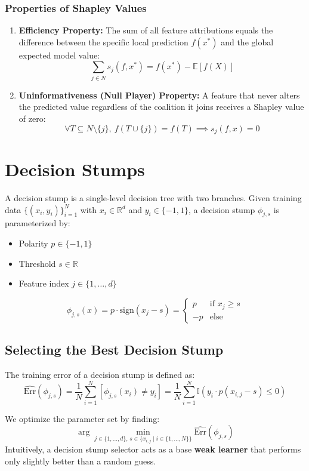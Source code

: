 \documentclass{article}
\begin{document}
\subsubsection{Properties of Shapley Values}
\begin{enumerate}
  \item \textbf{Efficiency Property:} The sum of all feature attributions equals the difference between the specific local prediction $f(x^*)$ and the global expected model value:
  \[ \sum_{j\in N}s_j(f,x^*) = f(x^*) - \mathbb{E}[f(X)] \]
  \item \textbf{Uninformativeness (Null Player) Property:} A feature that never alters the predicted value regardless of the coalition it joins receives a Shapley value of zero:
  \[ \forall T \subseteq N \setminus \{j\}, \ f(T \cup \{j\}) = f(T) \implies s_j(f,x) = 0 \]
\end{enumerate}


\section{Decision Stumps}
A decision stump is a single-level decision tree with two branches. Given training data $\{(x_i,y_i)\}_{i=1}^N$ with $x_i \in \mathbb{R}^d$ and $y_i \in \{-1,1\}$, a decision stump $\phi_{j,s}$ is parameterized by:
\begin{itemize}
  \item Polarity $p \in \{-1,1\}$
  \item Threshold $s \in \mathbb{R}$
  \item Feature index $j \in \{1,\dots,d\}$
\end{itemize}
\[ \phi_{j,s}(x) = p \cdot \text{sign}(x_j - s) = \begin{cases}
  p & \text{if } x_j \geq s \\
  -p & \text{else}
\end{cases} \]

\subsection{Selecting the Best Decision Stump}
The training error of a decision stump is defined as:
\[ \hat{\text{Err}}(\phi_{j,s}) = \frac{1}{N}\sum_{i=1}^N \left[\phi_{j,s}(x_i) \neq y_i\right] = \frac{1}{N}\sum_{i=1}^N \mathbb{I}\left(y_i \cdot p(x_{i,j} - s) \leq 0\right) \]

We optimize the parameter set by finding:
\[ \arg\min_{j \in \{1,\dots,d\}, \, s \in \{x_{i,j} \mid i \in \{1,\dots,N\}\}} \hat{\text{Err}}(\phi_{j,s}) \]
Intuitively, a decision stump selector acts as a base \textbf{weak learner} that performs only slightly better than a random guess.
\end{document}
